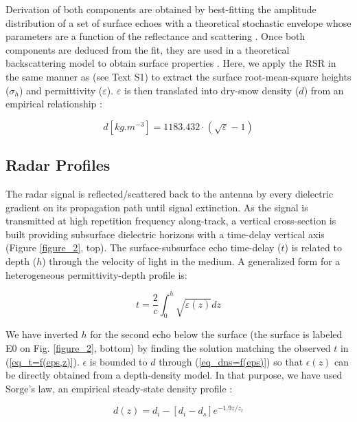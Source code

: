 \documentclass[draft,grl]{agutex}
\begin{document}
\begin{article}
Derivation of both components are obtained by best-fitting the amplitude distribution of a set of surface echoes with a theoretical stochastic envelope whose parameters are a function of the reflectance and scattering \citep{Destrempes-2010-ID165}. Once both components are deduced from the fit, they are used in a theoretical backscattering model to obtain surface properties \citep{Ulaby-1981-ID816}. Here, we apply the RSR in the same manner as \citet{Grima-2014-ID867,Grima-2014-ID865} (see Text S1) to extract the surface root-mean-square heights ($\sigma_h$) and permittivity ($\varepsilon$). $\varepsilon$ is then translated into dry-snow density ($d$) from an empirical relationship \citep{Kovacs-1995-ID697,Frolov-1999-ID216}:

\begin{equation} \label{eq_dns=f(eps)}
d[kg.m^{-3}]=1183.432\cdot(\sqrt{\varepsilon}-1)
\end{equation}

\subsection{Radar Profiles}  \label{Radar_Profiles}
The radar signal is reflected/scattered back to the antenna by every dielectric gradient on its propagation path until signal extinction. As the signal is transmitted at high repetition frequency along-track, a vertical cross-section is built providing subsurface dielectric horizons with a time-delay vertical axis (Figure \ref{figure_2}, top). The surface-subsurface echo time-delay ($t$) is related to depth ($h$) through the velocity of light in the medium. A generalized form for a heterogeneous permittivity-depth profile is:

\begin{equation} \label{eq_t=f(eps,z)}
t=\frac{2}{c} \int_0^h \sqrt{\varepsilon(z)}dz
\end{equation}

We have inverted $h$ for the second echo below the surface (the surface is labeled E0 on Fig. \ref{figure_2}, bottom) by finding the solution matching the observed $t$ in (\ref{eq_t=f(eps,z)}). $\epsilon$ is bounded to $d$ through (\ref{eq_dns=f(eps)}) so that $\epsilon(z)$ can be directly obtained from a depth-density model. In that purpose, we have used Sorge's law, an empirical steady-state density profile \citep{Cuffey-2010-ID819}:

\begin{equation} \label{eq_t=f(eq_sorge)}
d(z) = d_i-[d_i-d_s]e^{-1.9z/z_t}
\end{equation}


\end{article}
\end{document}
